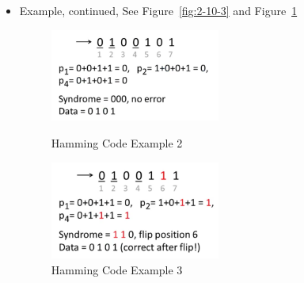 \documentclass[12pt]{ctexart}   %
\begin{document}
\begin{itemize}
		 \item Example, continued, See Figure~\ref{fig:2-10-3} and Figure~\ref{fig:2-10-4}
		 
		\begin{figure}
			\begin{minipage}[t]{0.5\linewidth}
				\centering
				\includegraphics[width=2.2in]{images/2-10-3}
				\caption{Hamming Code Example 2}
				\label{fig:2-10-3}
			\end{minipage}
			\begin{minipage}[t]{0.5\linewidth}
				\centering
				\includegraphics[width=2.2in]{images/2-10-4}
				\caption{Hamming Code Example 3}
				\label{fig:2-10-4}
			\end{minipage}
		\end{figure}
		 
	\end{itemize}
	
\end{document}
